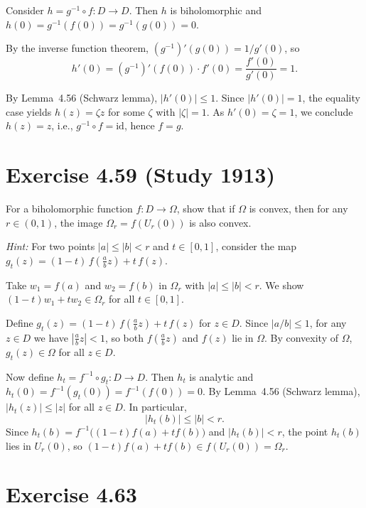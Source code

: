 \documentclass{article}
\begin{document}
\begin{solution}
  Consider $h = g^{-1} \circ f : D \to D$. Then $h$ is biholomorphic
  and $h(0) = g^{-1}(f(0)) = g^{-1}(g(0)) = 0$.

  By the inverse function theorem, $(g^{-1})'(g(0)) = 1/g'(0)$, so
  \[
    h'(0) = (g^{-1})'(f(0)) \cdot f'(0)
    = \frac{f'(0)}{g'(0)} = 1.
  \]

  By Lemma~4.56 (Schwarz lemma), $|h'(0)| \le 1$. Since
  $|h'(0)| = 1$, the equality case yields $h(z) = \zeta z$ for some
  $\zeta$ with $|\zeta| = 1$. As $h'(0) = \zeta = 1$, we conclude
  $h(z) = z$, i.e., $g^{-1} \circ f = \mathrm{id}$, hence $f = g$.
\end{solution}

\section{Exercise 4.59 (Study 1913)}

For a biholomorphic function $f : D \to \Omega$, show that if $\Omega$
is convex, then for any $r \in (0, 1)$, the image
$\Omega_r = f(U_r(0))$ is also convex.

\textit{Hint:} For two points $|a| \le |b| < r$ and $t \in [0, 1]$,
consider the map
$g_t(z) = (1-t)\,f\!\left(\frac{a}{b}z\right) + t\,f(z)$.

\begin{solution}
  Take $w_1 = f(a)$ and $w_2 = f(b)$ in $\Omega_r$ with
  $|a| \le |b| < r$. We show $(1-t)w_1 + tw_2 \in \Omega_r$ for all
  $t \in [0,1]$.

  Define
  $g_t(z) = (1-t)\,f\!\left(\tfrac{a}{b}z\right) + t\,f(z)$
  for $z \in D$. Since $|a/b| \le 1$, for any $z \in D$ we have
  $|\tfrac{a}{b}z| < 1$, so both $f(\tfrac{a}{b}z)$ and $f(z)$ lie
  in $\Omega$. By convexity of $\Omega$, $g_t(z) \in \Omega$ for all
  $z \in D$.

  Now define $h_t = f^{-1} \circ g_t : D \to D$. Then $h_t$ is
  analytic and
  $h_t(0) = f^{-1}(g_t(0)) = f^{-1}(f(0)) = 0$.
  By Lemma~4.56 (Schwarz lemma),
  $|h_t(z)| \le |z|$ for all $z \in D$.
  In particular,
  \[
    |h_t(b)| \le |b| < r.
  \]
  Since
  $h_t(b) = f^{-1}\!\bigl((1-t)f(a) + tf(b)\bigr)$
  and $|h_t(b)| < r$, the point $h_t(b)$ lies in $U_r(0)$, so
  $(1-t)f(a) + tf(b) \in f(U_r(0)) = \Omega_r$.
\end{solution}

\section{Exercise 4.63}
\end{document}
